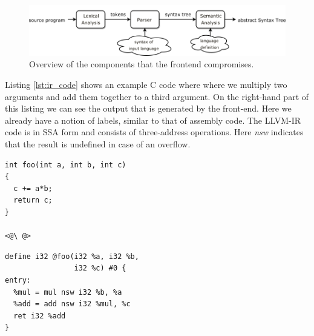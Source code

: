 \begin{figure}[t]
\centering
\includegraphics[width=\textwidth]{figures/frontend}%
\caption{Overview of the components that the frontend compromises.}
\label{fig:frontend}
\end{figure}

Listing \ref{lst:ir_code} shows an example C code where where we multiply two arguments and add them together to a third argument. On the right-hand part of this listing we can see the output that is generated by the front-end. Here we already have a notion of labels, similar to that of assembly code. The LLVM-IR code is in SSA form and consists of three-address operations. Here \emph{nsw} indicates that the result is undefined in case of an overflow.

\label{lst:ir_code}
\begin{center}
\hspace{2px}\begin{minipage}{.475\textwidth}
\lstset{style=customc}
\begin{lstlisting}[frame=tlrb]
int foo(int a, int b, int c)
{
  c += a*b;
  return c;
}

<@\ @>
\end{lstlisting}
\end{minipage}\hfill
\begin{minipage}{.475\textwidth}
\lstset{style=customasm}
\begin{lstlisting}[frame=tlrb]
define i32 @foo(i32 %a, i32 %b, 
                i32 %c) #0 {
entry:
  %mul = mul nsw i32 %b, %a
  %add = add nsw i32 %mul, %c
  ret i32 %add
}
\end{lstlisting}
\end{minipage}
\end{center}

